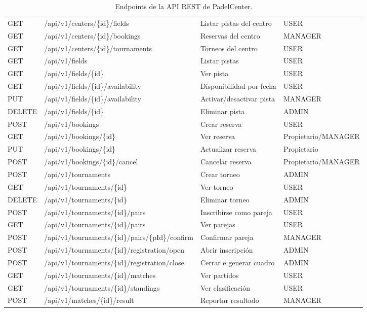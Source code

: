 \begin{table}[ht]
{\begin{tabular}{llll}
GET  & /api/v1/centers/\{id\}/fields & Listar pistas del centro & USER \\
GET  & /api/v1/centers/\{id\}/bookings & Reservas del centro & MANAGER \\
GET  & /api/v1/centers/\{id\}/tournaments & Torneos del centro & USER \\
\hline
GET  & /api/v1/fields & Listar pistas & USER \\
GET  & /api/v1/fields/\{id\} & Ver pista & USER \\
GET  & /api/v1/fields/\{id\}/availability & Disponibilidad por fecha & USER \\
PUT  & /api/v1/fields/\{id\}/availability & Activar/desactivar pista & MANAGER \\
DELETE & /api/v1/fields/\{id\} & Eliminar pista & ADMIN \\
\hline
POST & /api/v1/bookings & Crear reserva & USER \\
GET  & /api/v1/bookings/\{id\} & Ver reserva & Propietario/MANAGER \\
PUT  & /api/v1/bookings/\{id\} & Actualizar reserva & Propietario \\
POST & /api/v1/bookings/\{id\}/cancel & Cancelar reserva & Propietario/MANAGER \\
\hline
POST & /api/v1/tournaments & Crear torneo & ADMIN \\
GET  & /api/v1/tournaments/\{id\} & Ver torneo & USER \\
DELETE & /api/v1/tournaments/\{id\} & Eliminar torneo & ADMIN \\
POST & /api/v1/tournaments/\{id\}/pairs & Inscribirse como pareja & USER \\
GET  & /api/v1/tournaments/\{id\}/pairs & Ver parejas & USER \\
POST & /api/v1/tournaments/\{id\}/pairs/\{pId\}/confirm & Confirmar pareja & MANAGER \\
POST & /api/v1/tournaments/\{id\}/registration/open & Abrir inscripción & ADMIN \\
POST & /api/v1/tournaments/\{id\}/registration/close & Cerrar e generar cuadro & ADMIN \\
GET  & /api/v1/tournaments/\{id\}/matches & Ver partidos & USER \\
GET  & /api/v1/tournaments/\{id\}/standings & Ver clasificación & USER \\
\hline
POST & /api/v1/matches/\{id\}/result & Reportar resultado & MANAGER \\
\hline
\end{tabular}}
\caption{Endpoints de la API REST de PadelCenter.}
\label{tab:endpoints}
\end{table}

